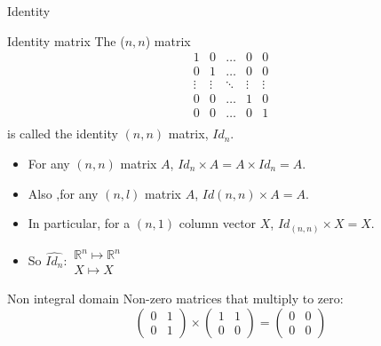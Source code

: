 \documentclass{beamer}
\begin{document}
\begin{frame}{Identity}
  \begin{block}{Identity matrix}
    The ($n,n$) matrix
    \[ \begin{array}{|ccccc|}
      1 & 0 & \dots & 0 &0\\
      0 & 1 &   \dots &0 & 0\\
      \vdots  & \vdots & \ddots & \vdots & \vdots\\
      0 & 0  & \dots & 1 & 0\\
      0 & 0  & \dots & 0 & 1\\
      \end{array}
      \]  is called the identity $(n,n)$ matrix, $Id_{n}$.  
  \end{block}
  

  \begin{itemize}
  \item For any $(n,n)$ matrix $A$, $Id_{n} \times A = A \times Id_{n} = A$.
  \item Also ,for any $(n,l)$ matrix $A$, $Id{(n,n)} \times A = A$.
  \item In particular, for a $(n,1)$ column vector $X$, $Id_{(n,n)} \times X = X$.
  \item So $\widehat{Id_{n}}: \begin{array}{l} \mathbb{R}^n \mapsto \mathbb{R}^n \\ X \mapsto X \end{array}$
  \end{itemize}
  
\end{frame}

\begin{frame}
  
  \begin{block}{Non integral domain}
    Non-zero matrices that multiply to zero:
    \[
    \begin{pmatrix}
      0 & 1\\
      0 & 1
    \end{pmatrix}
    \times
    \begin{pmatrix}
      1 & 1\\
      0 & 0
    \end{pmatrix}
    =
    \begin{pmatrix}
      0 & 0\\
      0 & 0
    \end{pmatrix}
    \]
  \end{block}
\end{frame}
\end{document}
